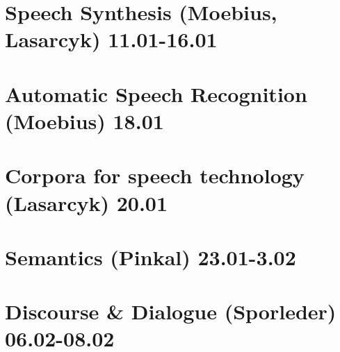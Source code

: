 \documentclass[11pt]{article}
\begin{document}
\section{Speech Synthesis (Moebius, Lasarcyk) 11.01-16.01}

\section{Automatic Speech Recognition (Moebius) 18.01}

\section{Corpora for speech technology (Lasarcyk) 20.01}

\section{Semantics (Pinkal) 23.01-3.02}

\section{Discourse \& Dialogue (Sporleder) 06.02-08.02}
\end{document}
